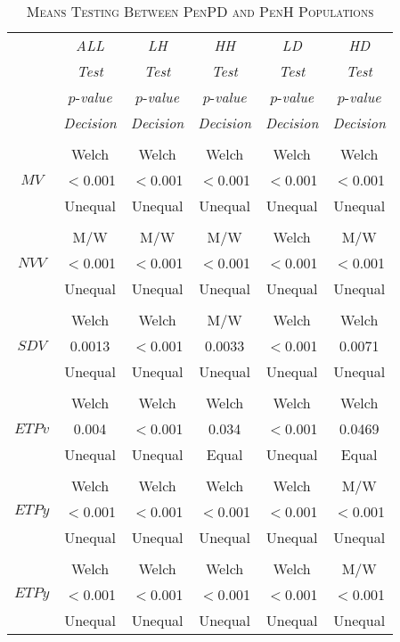 \begin{table}[h]
\centering
\caption{\textsc{Means Testing Between PenPD and PenH Populations}}
\begin{tabular*}{0.75\textwidth}{@{\extracolsep{\fill}} c | c c c c c}
	& {\textit{ALL}} & {\textit{LH}} & {\textit{HH}} & {\textit{LD}} & {\textit{HD}} \\
	\cline{2-6}  
	& {\textit{Test}} & {\textit{Test}} & {\textit{Test}} & {\textit{Test}} & {\textit{Test}} \\
	& $p$-{\textit{value}} & $p$-{\textit{value}} & $p$-{\textit{value}} & $p$-{\textit{value}} & $p$-{\textit{value}} \\
	& {\textit{Decision}} & {\textit{Decision}} & {\textit{Decision}} & {\textit{Decision}} & {\textit{Decision}} \\
	\hline 	\hline
	\\
	& Welch & Welch & Welch & Welch & Welch \\
	$MV$ & $<$0.001 & $<$0.001 & $<$0.001 & $<$0.001 & $<$0.001 \\
	& Unequal & Unequal & Unequal & Unequal & Unequal \\
	\hline
	\\
	& M/W & M/W & M/W & Welch & M/W \\
	$NVV$ & $<$0.001 & $<$0.001 & $<$0.001 & $<$0.001 & $<$0.001 \\
	& Unequal & Unequal & Unequal & Unequal & Unequal \\
	\hline
	\\
	& Welch & Welch & M/W & Welch & Welch \\
	$SDV$ & 0.0013 & $<$0.001 & 0.0033 & $<$0.001 & 0.0071 \\
	& Unequal & Unequal & Unequal & Unequal & Unequal \\
	\hline
	\\
	& Welch & Welch & Welch & Welch & Welch \\
	$ETPv$ & 0.004 & $<$0.001 & 0.034 & $<$0.001 & 0.0469 \\
	& Unequal & Unequal & Equal & Unequal & Equal \\	
	\hline
	\\
	& Welch & Welch & Welch & Welch & M/W \\
	$ETPy$ & $<$0.001 & $<$0.001 & $<$0.001 & $<$0.001 & $<$0.001 \\
	& Unequal & Unequal & Unequal & Unequal & Unequal \\
	\hline
	\\
	& Welch & Welch & Welch & Welch & M/W \\
	$ETPy$ & $<$0.001 & $<$0.001 & $<$0.001 & $<$0.001 & $<$0.001 \\
	& Unequal & Unequal & Unequal & Unequal & Unequal \\
	\hline
\end{tabular*}
\label{table:PenCTMeansInter}
\end{table}
 


